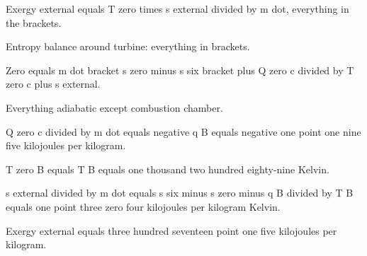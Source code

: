 Exergy external equals T zero times s external divided by m dot, everything in the brackets.

Entropy balance around turbine: everything in brackets.

Zero equals m dot bracket s zero minus s six bracket plus Q zero c divided by T zero c plus s external.

Everything adiabatic except combustion chamber.

Q zero c divided by m dot equals negative q B equals negative one point one nine five kilojoules per kilogram.

T zero B equals T B equals one thousand two hundred eighty-nine Kelvin.

s external divided by m dot equals s six minus s zero minus q B divided by T B equals one point three zero four kilojoules per kilogram Kelvin.

Exergy external equals three hundred seventeen point one five kilojoules per kilogram.